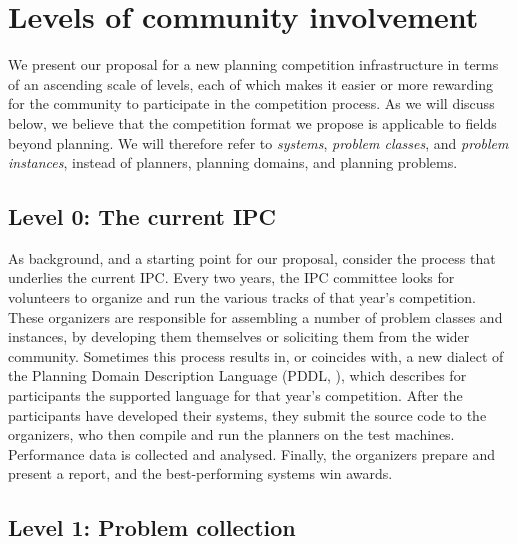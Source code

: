 \section{Levels of community involvement} \label{sec:levels}

We present our proposal for a new planning competition infrastructure
in terms of an ascending scale of levels, each of which makes it
easier or more rewarding for the community to participate in the
competition process. As we will discuss below, we believe that the
competition format we propose is applicable to fields beyond planning.  We
will therefore refer to \emph{systems}, \emph{problem classes}, and
\emph{problem instances}, instead of planners, planning domains, and
planning problems.


\subsection{Level 0: The current IPC}

As background, and a starting point for our proposal, consider the process
that underlies the current IPC. Every two years, the IPC committee looks
for volunteers to organize and run the various tracks of that year's
competition. These organizers are responsible for assembling a number of
problem classes and instances, by developing them themselves or soliciting
them from the wider community. Sometimes this process results in, or
coincides with, a new dialect of the Planning Domain Description Language
(PDDL, \cite{PDDL}), which describes for participants the supported
language for that year's competition. After the participants have developed
their systems, they submit the source code to the organizers, who then
compile and run the planners on the test machines.  Performance data is
collected and analysed.  Finally, the organizers prepare and present a
report, and the best-performing systems win awards.


\subsection{Level 1: Problem collection}

